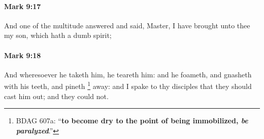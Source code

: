 		\paragraph{Mark 9:17} %
			\label{MARK-9-17}

			And one of the multitude answered and said, Master, I have brought unto thee my son, which hath a dumb spirit;

			\begin{framed}
			\scriptsize
				\begin{compactdesc}
					\item[SBLG] 
				\end{compactdesc}
			\end{framed}

		\paragraph{Mark 9:18} %
			\label{MARK-9-18}

			And wheresoever he taketh him, he teareth him: and he foameth, and gnasheth with his teeth, and pineth%
				\footnote{%
					BDAG 607a: ``\textbf{to become dry to the point of being immobilized, \textit{be paralyzed}}.''
					}
			away: and I spake to thy disciples that they should cast him out; and they could not.

